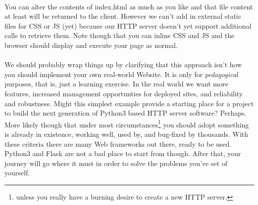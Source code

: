 \paragraph{} You can alter the contents of index.html as much as you like and that file content at least will be returned to the client. However we can't add in external static files for CSS or JS (yet) because our HTTP server doesn't yet support additional calls to retrieve them. Note though that you can inline CSS and JS and the browser should display and execute your page as normal.





\paragraph{} We should probably wrap things up by clarifying that this approach isn't how you should implement your own real-world Website. It is only for \emph{pedagogical} purposes, that is, just a learning exercise. In the real world we want more features, increased management opportunties for deployed sites, and reliability and robustness. Might this simplest example provide a starting place for a project to build the next generation of Python3 based HTTP server software? Perhaps. More likely though that under most circumstances\footnote{unless you really have a burning desire to create a new HTTP server.} you should adopt something is already in existence, working well, used by, and bug-fixed by thousands. With these criteria there are many Web frameworks out there, ready to be used. Python3 and Flask are not a bad place to start from though. After that, your journey will go where it must in order to solve the problems you've set of yourself.
